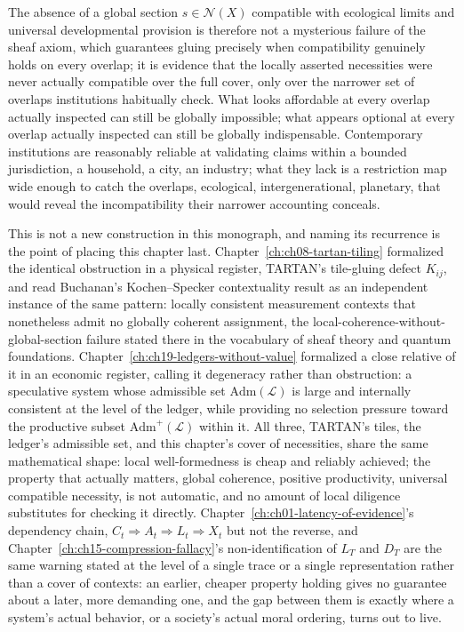 The absence of a global section $s \in \mathcal{N}(X)$ compatible with ecological limits and universal developmental provision is therefore not a mysterious failure of the sheaf axiom, which guarantees gluing precisely when compatibility genuinely holds on every overlap; it is evidence that the locally asserted necessities were never actually compatible over the full cover, only over the narrower set of overlaps institutions habitually check. What looks affordable at every overlap actually inspected can still be globally impossible; what appears optional at every overlap actually inspected can still be globally indispensable. Contemporary institutions are reasonably reliable at validating claims within a bounded jurisdiction, a household, a city, an industry; what they lack is a restriction map wide enough to catch the overlaps, ecological, intergenerational, planetary, that would reveal the incompatibility their narrower accounting conceals.

This is not a new construction in this monograph, and naming its recurrence is the point of placing this chapter last. Chapter~\ref{ch:ch08-tartan-tiling} formalized the identical obstruction in a physical register, TARTAN's tile-gluing defect $K_{ij}$, and read Buchanan's Kochen--Specker contextuality result as an independent instance of the same pattern: locally consistent measurement contexts that nonetheless admit no globally coherent assignment, the local-coherence-without-global-section failure stated there in the vocabulary of sheaf theory and quantum foundations. Chapter~\ref{ch:ch19-ledgers-without-value} formalized a close relative of it in an economic register, calling it degeneracy rather than obstruction: a speculative system whose admissible set $\mathrm{Adm}(\mathcal{L})$ is large and internally consistent at the level of the ledger, while providing no selection pressure toward the productive subset $\mathrm{Adm}^+(\mathcal{L})$ within it. All three, TARTAN's tiles, the ledger's admissible set, and this chapter's cover of necessities, share the same mathematical shape: local well-formedness is cheap and reliably achieved; the property that actually matters, global coherence, positive productivity, universal compatible necessity, is not automatic, and no amount of local diligence substitutes for checking it directly. Chapter~\ref{ch:ch01-latency-of-evidence}'s dependency chain, $C_t \Rightarrow A_t \Rightarrow L_t \Rightarrow X_t$ but not the reverse, and Chapter~\ref{ch:ch15-compression-fallacy}'s non-identification of $L_T$ and $D_T$ are the same warning stated at the level of a single trace or a single representation rather than a cover of contexts: an earlier, cheaper property holding gives no guarantee about a later, more demanding one, and the gap between them is exactly where a system's actual behavior, or a society's actual moral ordering, turns out to live.

